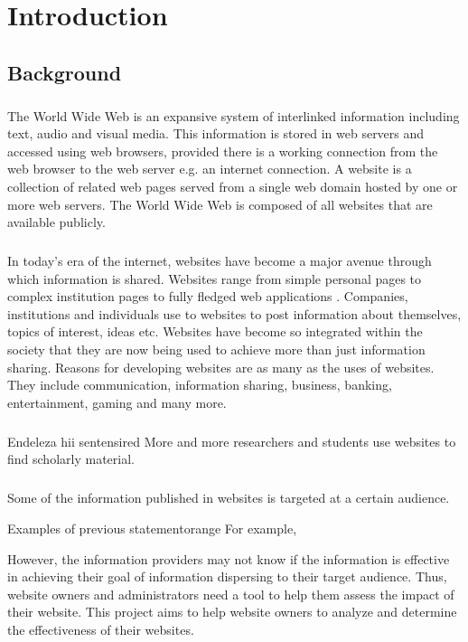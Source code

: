 \chapter{Introduction}
\section{Background}
\paragraph{}
The World Wide Web is an expansive system of interlinked information including text, audio and visual media. This information is stored in web servers and accessed using web browsers, provided there is a working connection from the web browser to the web server e.g. an internet connection. A website is a collection of related web pages served from a single web domain hosted by one or more web servers. The World Wide Web is composed of all websites that are available publicly.
\paragraph{}
In today's era of the internet, websites have become a major avenue through which information is shared. Websites range from simple personal pages to complex institution pages to fully fledged web applications . Companies, institutions and individuals use to websites to post information about themselves, topics of interest, ideas etc. Websites have become so integrated within the society that they are now being used to achieve more than just information sharing. Reasons for developing websites are as many as the uses of websites. They include communication, information sharing, business, banking, entertainment, gaming and many more.
\paragraph{}
\begin{review_comment}{Endeleza hii sentensi}{red}
{More and more researchers and students use websites to find scholarly material.
}\end{review_comment}
\paragraph{}
Some of the information published in websites is targeted at a certain audience. \begin{review_comment}{Examples of previous statement}{orange}
{For example,}\end{review_comment}
However, the information providers may not know if the information is effective in achieving their goal of information dispersing to their target audience. Thus, website owners and administrators need a tool to help them assess the impact of their website. This project aims to help website owners to analyze and determine the effectiveness of their websites.


